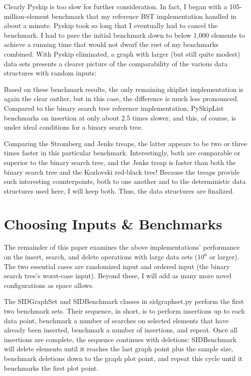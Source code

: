 \documentclass{article}
\begin{document}


Clearly Pyskip is too slow for further consideration. In fact, I began with a 105-million-element benchmark that my reference BST implementation handled in about a minute. Pyskip took so long that I eventually had to cancel the benchmark. I had to pare the initial benchmark down to below 1,000 elements to achieve a running time that would not dwarf the rest of my benchmarks combined. With Pyskip eliminated, a graph with larger (but still quite modest) data sets presents a clearer picture of the comparability of the various data structures with random inputs:



Based on these benchmark results, the only remaining skiplist implementation is again the clear outlier, but in this case, the difference is much less pronounced. Compared to the binary search tree reference implementation, PySkipList benchmarks on insertion at only about 2.5 times slower, and this, of course, is under ideal conditions for a binary search tree.

Comparing the Stromberg and Jenks treaps, the latter appears to be two or three times faster in this particular benchmark. Interestingly, both are comparable or superior to the binary search tree, and the Jenks treap is faster than both the binary search tree and the Kozlovski red-black tree! Because the treaps provide such interesting counterpoints, both to one another and to the deterministic data structures used here, I will keep both. Thus, the data structures are finalized.

\section{Choosing Inputs \& Benchmarks}
The remainder of this paper examines the above implementations' performance on the insert, search, and delete operations with large data sets ($10^6$ or larger). The two essential cases are randomized input and ordered input (the binary search tree's worst-case input). Beyond these, I will add as many more novel configurations as space allows.

The SIDGraphSet and SIDBenchmark classes in sidgraphset.py perform the first two benchmark sets. Their sequence, in short, is to perform insertions up to each data point, benchmark a number of searches on selected elements that have already been inserted, benchmark a number of insertions, and repeat. Once all insertions are complete, the sequence continues with deletions: SIDBenchmark will delete elements until it reaches the last graph point plus the sample size, benchmark deletions down to the graph plot point, and repeat this cycle until it benchmarks the first plot point.
\end{document}
